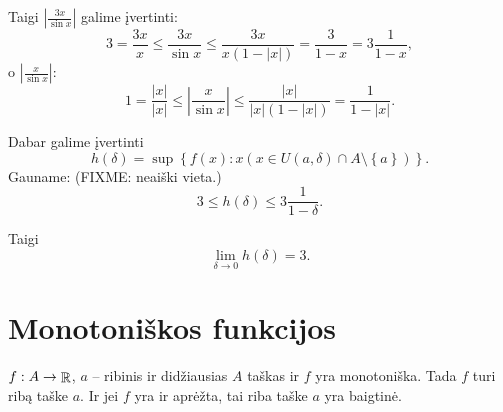 \begin{exmp}
  Taigi $\left| \frac{3x}{\sin x} \right|$ galime įvertinti:
  \begin{equation*}
    3 = \frac{3x}{x} \leq \frac{3x}{\sin x} \leq \frac{3x}{x(1 - |x|)}
    = \frac{3}{1 - x} = 3 \frac{1}{1 - x},
  \end{equation*}
  o $\left| \frac{x}{\sin x} \right|$:
  \begin{equation*}
    1 = \frac{|x|}{|x|} \leq \left| \frac{x}{\sin x} \right| \leq
    \frac{|x|}{|x|(1 - |x|)} = \frac{1}{1 - |x|}.
  \end{equation*}

  Dabar galime įvertinti
  \begin{equation*}
    h(\delta) = \sup \left\{ f(x) : x 
      (x \in U(a, \delta) \cap A \setminus \left\{ a \right\}) \right\}.
  \end{equation*}
  Gauname: (FIXME: neaiški vieta.)
  \begin{equation*}
    3 \leq h(\delta) \leq 3 \frac{1}{1 - \delta}.
  \end{equation*}

  Taigi
  \begin{equation*}
    \lim_{\delta \to 0} h(\delta) = 3.
  \end{equation*}
\end{exmp}

\section{Monotoniškos funkcijos}

\begin{prop}
  \label{lim_mon}
  $f: A \to \mathop{\mathbb{R}}$, $a$ – ribinis ir didžiausias $A$ taškas ir $f$ yra
  monotoniška. Tada $f$ turi ribą taške $a$. Ir jei $f$ yra ir aprėžta,
  tai riba taške $a$ yra baigtinė.
\end{prop}

